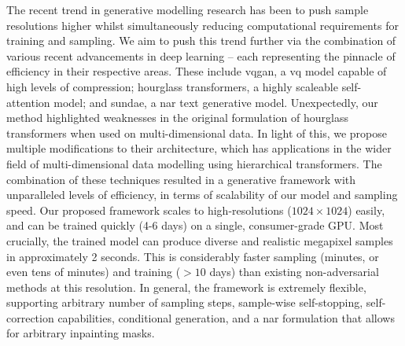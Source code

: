 The recent trend in generative modelling research has been to push sample
resolutions higher whilst simultaneously reducing computational requirements for
training and sampling. We aim to push this trend further via the combination of
various recent advancements in deep learning -- each representing the pinnacle
of efficiency in their respective areas. These include \acrfull{vqgan}, a
\gls{vq} model capable of high levels of compression; hourglass transformers, a
highly scaleable self-attention model; and \acrfull{sundae}, a
\acrfull{nar} text generative model. Unexpectedly, our method highlighted
weaknesses in the original formulation of hourglass transformers when used on
multi-dimensional data. In light of this, we propose multiple modifications to
their architecture, which has applications in the wider field of
multi-dimensional data modelling using hierarchical transformers. The
combination of these techniques resulted in a generative framework with
unparalleled levels of efficiency, in terms of scalability of our model and
sampling speed. Our proposed framework scales to high-resolutions ($1024 \times
1024$) easily, and can be trained quickly (4-6 days) on a single, consumer-grade
GPU. Most crucially, the trained model can produce diverse and realistic
megapixel samples in approximately 2 seconds. This is considerably faster
sampling (minutes, or even tens of minutes) and training ($>10$ days) than
existing non-adversarial methods at this resolution. In general, the framework
is extremely flexible, supporting arbitrary number of sampling steps,
sample-wise self-stopping, self-correction capabilities, conditional generation,
and a \acrshort{nar} formulation that allows for arbitrary inpainting masks.

